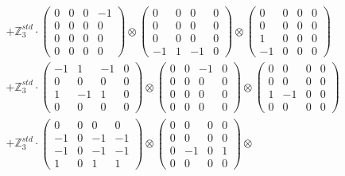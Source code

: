 \documentclass{article}
\begin{document}
{\begin{align}
        &+ \label{Rs16_Rc11_Solutions_Solution_6-c17} \mathbb{Z}_3^{std} \cdot 
            \begin{pmatrix} 0 & 0 & 0 & -1 \\ 0 & 0 & 0 & 0 \\ 0 & 0 & 0 & 0 \\ 0 & 0 & 0 & 0 \end{pmatrix} \otimes 
            \begin{pmatrix} 0 & 0 & 0 & 0 \\ 0 & 0 & 0 & 0 \\ 0 & 0 & 0 & 0 \\ -1 & 1 & -1 & 0 \end{pmatrix} \otimes 
            \begin{pmatrix} 0 & 0 & 0 & 0 \\ 0 & 0 & 0 & 0 \\ 1 & 0 & 0 & 0 \\ -1 & 0 & 0 & 0 \end{pmatrix} \\ 
        &+ \label{Rs16_Rc11_Solutions_Solution_6-c18} \mathbb{Z}_3^{std} \cdot 
            \begin{pmatrix} -1 & 1 & -1 & 0 \\ 0 & 0 & 0 & 0 \\ 1 & -1 & 1 & 0 \\ 0 & 0 & 0 & 0 \end{pmatrix} \otimes 
            \begin{pmatrix} 0 & 0 & -1 & 0 \\ 0 & 0 & 0 & 0 \\ 0 & 0 & 0 & 0 \\ 0 & 0 & 0 & 0 \end{pmatrix} \otimes 
            \begin{pmatrix} 0 & 0 & 0 & 0 \\ 0 & 0 & 0 & 0 \\ 1 & -1 & 0 & 0 \\ 0 & 0 & 0 & 0 \end{pmatrix} \\ 
        &+ \label{Rs16_Rc11_Solutions_Solution_6-c19} \mathbb{Z}_3^{std} \cdot 
            \begin{pmatrix} 0 & 0 & 0 & 0 \\ -1 & 0 & -1 & -1 \\ -1 & 0 & -1 & -1 \\ 1 & 0 & 1 & 1 \end{pmatrix} \otimes 
            \begin{pmatrix} 0 & 0 & 0 & 0 \\ 0 & 0 & 0 & 0 \\ 0 & -1 & 0 & 1 \\ 0 & 0 & 0 & 0 \end{pmatrix} \otimes 

\end{align}}
\end{document}
